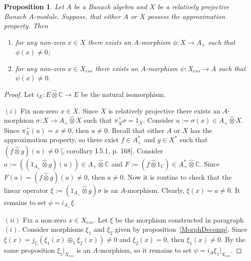 \documentclass[12pt]{article}
\newtheorem{proposition}[theorem]{Proposition}
\newcommand{\projtens}{\mathbin{\widehat{\otimes}}}
\begin{document}
\begin{proposition}\label{RelProjNecesCond} Let $A$ be a Banach algebra and $X$
    be a relatively projective Banach $A$-module. Suppose, that either $A$ or
    $X$ possess the approximation property. Then
    \begin{enumerate}[label = (\roman*)]
        \item for any non-zero $x\in X$ there exists an $A$-morphism $\phi:X\to
                  A_+$ such that $\phi(x)\neq 0$;
        \item for any non-zero $x\in X_{ess}$ there exists an $A$-morphism
              $\psi:X_{ess}\to A$ such that $\psi(x)\neq 0$.
    \end{enumerate}
\end{proposition}
\begin{proof} Let $i_E:E\projtens \mathbb{C}\to E$ be the natural isomorphism.

    $(i)$ Fix non-zero $x\in X$. Since $X$ is relatively projective there exists
    an $A$-morphism $\sigma:X\to A_+\projtens X$ such that $\pi_X^+\sigma=1_X$.
    Consider $u:=\sigma(x)\in A_+\projtens X$. Since $\pi_X^+(u)=x\neq 0$, then
    $u\neq 0$. Recall that either $A$ or $X$ has the approximation property, so
    there exist $f\in A_+^*$ and $g\in X^*$ such that $(f\projtens g)(u)\neq 0$
    [\cite{GrothProdTenTopNucl}, corollary I.5.1, p. 168]. Consider
    $a:=((1_{A_+}\projtens g)(u))\in A_+\projtens\mathbb{C}$ and $F:=(f\projtens
        1_{\mathbb{C}})\in A_+^*\projtens\mathbb{C}$. Since $F(a)=(f\projtens
        g)(u)\neq 0$, then $a\neq 0$. Now it is routine to check that the linear
    operator $\xi:=(1_{A_+}\projtens g)\sigma$ is an $A$-morphism. Clearly,
    $\xi(x)=a\neq 0$. It remains to set $\phi=i_{A_+}\xi$.

    $(ii)$ Fix a non-zero $x\in X_{ess}$. Let $\xi$ be the morphism constructed
    in paragraph $(i)$. Consider morphisms $\xi_1$ and $\xi_2$ given by
    proposition~\ref{MorphDecomp}. Since
    $\xi(x)=j_{\mathbb{C}}(\xi_1(x)\oplus_1\xi_2(x))\neq 0$ and $\xi_2(x)=0$,
    then $\xi_1(x)\neq 0$. By the same proposition $\xi_1|_{X_{ess}}$ is an
    $A$-morphism, so it remains to set $\psi=i_A \xi_1|_{X_{ess}}$.

\end{proof}

\end{document}
